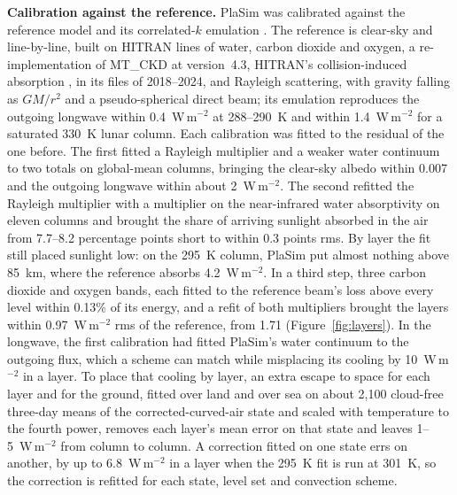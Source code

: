 \textbf{Calibration against the reference.} PlaSim was calibrated against the reference model and its
correlated-$k$ emulation \autocite{lacis1991description}. The reference is clear-sky and line-by-line, built on
HITRAN lines of water, carbon dioxide and oxygen, a re-implementation of MT\_CKD \autocite{mlawer2023inclusion} at version~4.3,
HITRAN's collision-induced absorption \autocite{karman2019update}, in its files of 2018--2024, and Rayleigh
scattering,
with gravity falling as $GM/r^2$ and a pseudo-spherical direct beam; its emulation reproduces the outgoing
longwave within 0.4~W\,m$^{-2}$ at 288--290~K and within 1.4~W\,m$^{-2}$ for a saturated 330~K lunar
column. Each calibration was fitted to the residual of the one before. The first fitted a Rayleigh
multiplier and a weaker water continuum to two totals on global-mean columns, bringing the clear-sky albedo
within 0.007 and the outgoing longwave within about 2~W\,m$^{-2}$. The second refitted the Rayleigh multiplier with a multiplier on the near-infrared water
absorptivity on eleven columns and brought the share of arriving sunlight absorbed in the air from 7.7--8.2
percentage points short to within 0.3 points rms. By layer the fit still placed sunlight low: on the
295~K column, PlaSim put almost nothing above 85~km, where the reference absorbs
4.2~W\,m$^{-2}$. In a third step, three carbon dioxide and oxygen bands, each fitted to the reference beam's loss
above every level within 0.13\% of its energy, and a refit of both multipliers brought the layers within
0.97~W\,m$^{-2}$ rms of the reference, from 1.71 (Figure~\ref{fig:layers}). In the longwave, the
first calibration had fitted PlaSim's water continuum to the outgoing flux, which a scheme can match while
misplacing its cooling by 10~W\,m$^{-2}$ in a layer. To place that cooling by layer, an extra escape to space
for each layer and for the ground, fitted over land and over sea on about 2,100 cloud-free three-day means of
the corrected-curved-air state and scaled with temperature to the fourth power, removes each layer's mean error on that state
and leaves 1--5~W\,m$^{-2}$ from column to column. A correction fitted on one state errs on another,
by up to 6.8~W\,m$^{-2}$ in a layer when the 295~K fit is run at 301~K, so the correction is refitted for each state, level
set and convection scheme.

